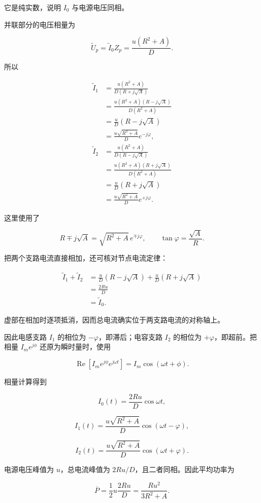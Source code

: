 \documentclass[12pt,a4paper,UTF8]{ctexart}
\begin{document}
它是纯实数，说明 \(I_0\) 与电源电压同相。

并联部分的电压相量为

\[\widetilde U_p=\widetilde I_0Z_p
=\frac{u(R^2+A)}{D}.\]

所以

\[\begin{aligned}
\widetilde I_1
&=\frac{u(R^2+A)}{D(R+j\sqrt A)}\\
&=\frac{u(R^2+A)(R-j\sqrt A)}{D(R^2+A)}\\
&=\frac uD(R-j\sqrt A)\\
&=\frac{u\sqrt{R^2+A}}{D}e^{-j\varphi},\\
\widetilde I_2
&=\frac{u(R^2+A)}{D(R-j\sqrt A)}\\
&=\frac{u(R^2+A)(R+j\sqrt A)}{D(R^2+A)}\\
&=\frac uD(R+j\sqrt A)\\
&=\frac{u\sqrt{R^2+A}}{D}e^{+j\varphi}.
\end{aligned}\]

这里使用了

\[R\mp j\sqrt A=\sqrt{R^2+A}\,e^{\mp j\varphi},
\qquad \tan\varphi=\frac{\sqrt A}{R}.\]

把两个支路电流直接相加，还可核对节点电流定律：

\[\begin{aligned}
\widetilde I_1+\widetilde I_2
&=\frac uD(R-j\sqrt A)+\frac uD(R+j\sqrt A)\\
&=\frac{2Ru}{D}\\
&=\widetilde I_0.
\end{aligned}\]

虚部在相加时逐项抵消，因而总电流确实位于两支路电流的对称轴上。

因此电感支路 \(I_1\) 的相位为 \(-\varphi\)，即滞后；电容支路 \(I_2\)
的相位为 \(+\varphi\)，即超前。把相量 \(I_m e^{j\phi}\)
还原为瞬时量时，使用

\[\operatorname{Re}\!\left[I_me^{j\phi}e^{j\omega t}\right]
=I_m\cos(\omega t+\phi).\]

相量计算得到

\[\boxed{I_0(t)=\frac{2Ru}{D}\cos\omega t},\]

\[\boxed{I_1(t)=\frac{u\sqrt{R^2+A}}{D}\cos(\omega t-\varphi)},\]

\[\boxed{I_2(t)=\frac{u\sqrt{R^2+A}}{D}\cos(\omega t+\varphi)}.\]

电源电压峰值为 \(u\)，总电流峰值为 \(2Ru/D\)，且二者同相。因此平均功率为

\[\boxed{\overline P=\frac12u\frac{2Ru}{D}
=\frac{Ru^2}{3R^2+A}}.\]
\end{document}
